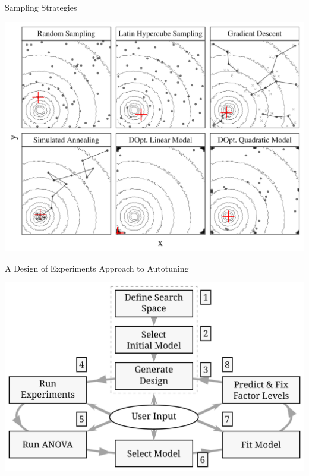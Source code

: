 \documentclass[10pt, compress, aspectratio=169, xcolor={table,usenames,dvipsnames}]{beamer}
\begin{document}
\begin{frame}[label={sec:orga84e5f7}]{Sampling Strategies}
\begin{center}
\begin{center}
\includegraphics[width=.70\textwidth]{../../../img/sampling_comparison.pdf}
\end{center}
\end{center}
\end{frame}

\begin{frame}[label={sec:orgce3ec2e}]{A Design of Experiments Approach to Autotuning}
\begin{center}
\begin{center}
\includegraphics[width=.72\linewidth]{../../../img/doe_anova_strategy.pdf}
\end{center}

\vspace{-.2cm}
\end{center}
\end{frame}
\end{document}
